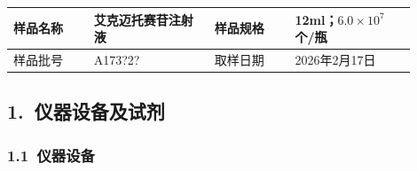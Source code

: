 \documentclass[UTF8,10pt,a4paper,fontset=fandol]{ctexart}
\newcommand{\fieldvalue}[1]{#1}
\newcommand{\handwritten}[1]{#1}
\begin{document}
\begin{tabular}{|p{0.18\linewidth}|p{0.27\linewidth}|p{0.18\linewidth}|p{0.27\linewidth}|}
\hline
样品名称 &
\fieldvalue{艾克迈托赛苷注射液} &
样品规格 &
\fieldvalue{12ml；$6.0\times10^{7}$个/瓶}
\\ \hline
样品批号 &
\fieldvalue{\handwritten{A173?2?}} &
取样日期 &
\fieldvalue{\handwritten{2026年2月17日}}
\\ \hline
\end{tabular}

\subsection*{1.\ 仪器设备及试剂}

\subsubsection*{1.1\ 仪器设备}
\end{document}
